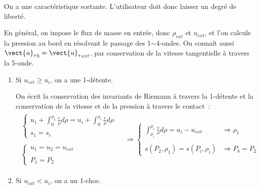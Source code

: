 On a une caract\'eristique sortante.
L'utilisateur doit donc laisser un degr\'e de libert\'e.

En g\'en\'eral, on impose le flux de masse en entr\'ee, donc $\rho_{ext}$
et $u_{ext}$, et l'on calcule la pression au bord en r\'esolvant
le passage des 1$\sim$4-ondes.
On conna\^it aussi ${\vect{u}_\tau}_b = {\vect{u}_\tau}_{ext}$,
par conservation de la vitesse tangentielle \`a travers la 5-onde.

\begin{enumerate}

\item Si $u_{ext} \geqslant u_i$,
on a une 1-d\'etente.

On \'ecrit la conservation
des invariants de Riemann \`a travers la 1-d\'etente
et la conservation de la vitesse et de la pression \`a travers le contact~:
\begin{equation}
\begin{array}{lll}
\begin{array}{l}
\left\{\begin{array}{l}
u_1 + \displaystyle\int_0^{\rho_1} \frac{c}{\rho} d\rho
= u_i + \displaystyle\int_0^{\rho_i} \frac{c}{\rho} d\rho\\
\\
s_1 = s_i
\end{array}\right.\\
\\
\left\{\begin{array}{l}
u_1 = u_2 = u_{ext}\\
\\
P_1 = P_2
\end{array}\right.
\end{array}
&
\Rightarrow
\left\{\begin{array}{ll}
\displaystyle\int_{\rho_i}^{\rho_1} \frac{c}{\rho} d\rho
= u_i - u_{ext}
& \Rightarrow \rho_1\\
\\
s(P_2,\rho_1) = s(P_i,\rho_i)
& \Rightarrow P_b = P_2
\end{array}\right.
\end{array}
\end{equation}

\item Si $u_{ext} < u_i$,
on a un 1-choc.


\end{enumerate}

